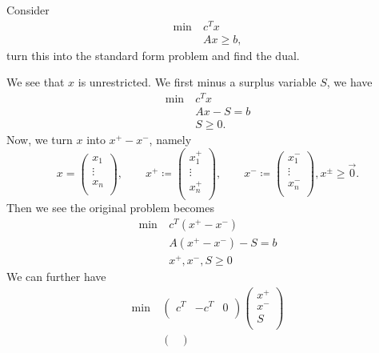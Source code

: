 \begin{eg}
	Consider
	\begin{align*}
		\min~ & c^Tx       \\
		      & Ax \geq b,
	\end{align*}
	turn this into the standard form problem and find the dual.

	We see that \(x\) is unrestricted. We first minus a surplus variable \(S\), we have
	\begin{align*}
		\min~ & c^Tx      \\
		      & Ax - S= b \\
		      & S \geq 0.
	\end{align*}
	Now, we turn \(x\) into \(x^+ - x^-\), namely
	\[
		x = \begin{pmatrix}
			x_1    \\
			\vdots \\
			x_n    \\
		\end{pmatrix},\qquad
		x^+ \coloneqq \begin{pmatrix}
			x^+_1  \\
			\vdots \\
			x^+_n  \\
		\end{pmatrix},\qquad
		x^- \coloneqq \begin{pmatrix}
			x^-_1  \\
			\vdots \\
			x^-_n  \\
		\end{pmatrix}, x^\pm \geq \vec{0}.
	\]
	Then we see the original problem becomes
	\begin{align*}
		\min~ & c^T(x^+ - x^-)       \\
		      & A(x^+ - x^-) - S = b \\
		      & x^+, x^-, S \geq 0
	\end{align*}
	\hr
	We can further have
	\begin{align*}
		\min~ & \begin{pmatrix}
			c^{T} & -c^{T} & 0 \\
		\end{pmatrix}\begin{pmatrix}
			x^+ \\
			x^- \\
			S   \\
		\end{pmatrix}     \\
		      & \begin{pmatrix}

\end{pmatrix}
\end{align*}
\end{eg}
